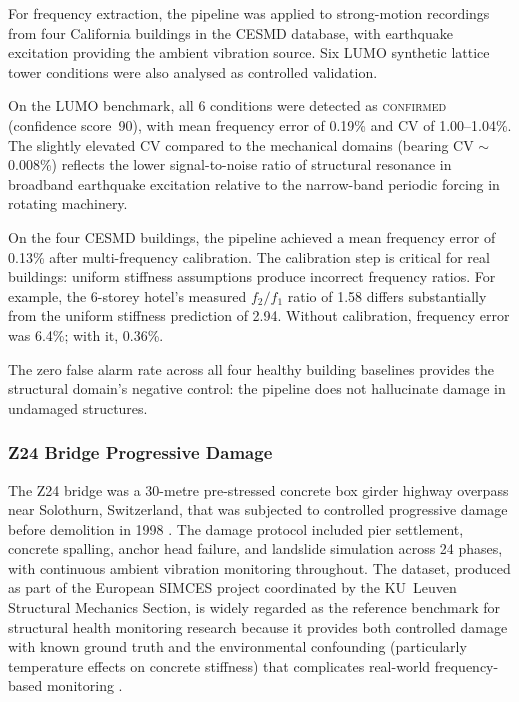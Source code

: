 \documentclass[11pt,a4paper]{article}
\begin{document}
For frequency extraction, the pipeline was applied to strong-motion recordings from four California buildings in the CESMD database, with earthquake excitation providing the ambient vibration source. Six LUMO synthetic lattice tower conditions were also analysed as controlled validation.

On the LUMO benchmark, all 6 conditions were detected as \textsc{confirmed} (confidence score~90), with mean frequency error of 0.19\% and CV of 1.00--1.04\%. The slightly elevated CV compared to the mechanical domains (bearing CV ${\sim}$0.008\%) reflects the lower signal-to-noise ratio of structural resonance in broadband earthquake excitation relative to the narrow-band periodic forcing in rotating machinery.

On the four CESMD buildings, the pipeline achieved a mean frequency error of 0.13\% after multi-frequency calibration. The calibration step is critical for real buildings: uniform stiffness assumptions produce incorrect frequency ratios. For example, the 6-storey hotel's measured $f_2/f_1$ ratio of 1.58 differs substantially from the uniform stiffness prediction of 2.94. Without calibration, frequency error was 6.4\%; with it, 0.36\%.

The zero false alarm rate across all four healthy building baselines provides the structural domain's negative control: the pipeline does not hallucinate damage in undamaged structures.

\subsubsection{Z24 Bridge Progressive Damage}
\label{sec:z24}

The Z24 bridge was a 30-metre pre-stressed concrete box girder highway overpass near Solothurn, Switzerland, that was subjected to controlled progressive damage before demolition in 1998 \citep{Maeck2003,DeRoeck2003,Reynders2015}. The damage protocol included pier settlement, concrete spalling, anchor head failure, and landslide simulation across 24 phases, with continuous ambient vibration monitoring throughout. The dataset, produced as part of the European SIMCES project coordinated by the KU~Leuven Structural Mechanics Section, is widely regarded as the reference benchmark for structural health monitoring research because it provides both controlled damage with known ground truth and the environmental confounding (particularly temperature effects on concrete stiffness) that complicates real-world frequency-based monitoring \citep{Peeters2001,Reynders2014}.
\end{document}
